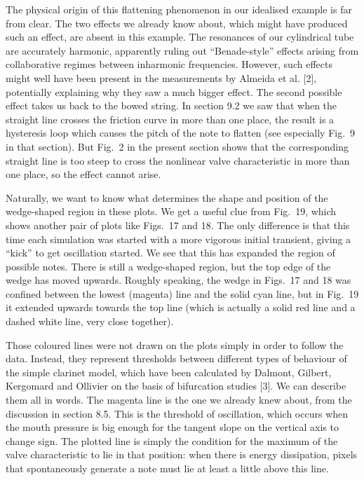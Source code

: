   The physical origin of this flattening phenomenon in our idealised example is 
  far from clear. The two effects we already know about, which might have 
  produced such an effect, are absent in this example. The resonances of our 
  cylindrical tube are accurately harmonic, apparently ruling out 
  “Benade-style” effects arising from collaborative regimes between inharmonic 
  frequencies. However, such effects might well have been present in the 
  measurements by Almeida et al. [2], potentially explaining why they saw a 
  much bigger effect. The second possible effect takes us back to the bowed 
  string. In section 9.2 we saw that when the straight line crosses the 
  friction curve in more than one place, the result is a hysteresis loop which 
  causes the pitch of the note to flatten (see especially Fig.\ 9 in that 
  section). But Fig.\ 2 in the present section shows that the corresponding 
  straight line is too steep to cross the nonlinear valve characteristic in 
  more than one place, so the effect cannot arise. 

  Naturally, we want to know what determines the shape and position of the 
  wedge-shaped region in these plots. We get a useful clue from Fig.\ 19, which 
  shows another pair of plots like Figs.\ 17 and 18. The only difference is 
  that this time each simulation was started with a more vigorous initial 
  transient, giving a “kick” to get oscillation started. We see that this has 
  expanded the region of possible notes. There is still a wedge-shaped region, 
  but the top edge of the wedge has moved upwards. Roughly speaking, the wedge 
  in Figs.\ 17 and 18 was confined between the lowest (magenta) line and the 
  solid cyan line, but in Fig.\ 19 it extended upwards towards the top line 
  (which is actually a solid red line and a dashed white line, very close 
  together). 



  Those coloured lines were not drawn on the plots simply in order to follow 
  the data. Instead, they represent thresholds between different types of 
  behaviour of the simple clarinet model, which have been calculated by 
  Dalmont, Gilbert, Kergomard and Ollivier on the basis of bifurcation studies 
  [3]. We can describe them all in words. The magenta line is the one we 
  already knew about, from the discussion in section 8.5. This is the threshold 
  of oscillation, which occurs when the mouth pressure is big enough for the 
  tangent slope on the vertical axis to change sign. The plotted line is simply 
  the condition for the maximum of the valve characteristic to lie in that 
  position: when there is energy dissipation, pixels that spontaneously 
  generate a note must lie at least a little above this line. 

